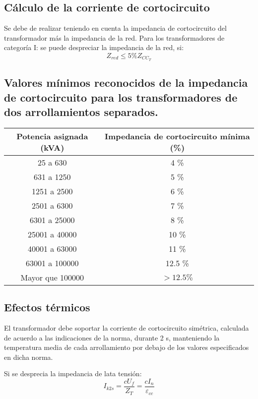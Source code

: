 \subsection{Cálculo de la corriente de cortocircuito}
Se debe de realizar teniendo en cuenta la impedancia de cortocircuito del transformador más la impedancia de la red. Para los transformadores de categoría I: se puede despreciar la impedancia de la red, si:
\begin{equation}
	Z_{red}\le 5\% Z_{CC_T}
\end{equation}
\subsection{Valores mínimos reconocidos de la impedancia de cortocircuito para los transformadores de dos arrollamientos separados.}
\begin{table}[H]
	\centering
	\begin{tabular}{|c|c|}
		\hline
		\textbf{Potencia asignada (kVA)} & \textbf{Impedancia de cortocircuito mínima (\%)} \\
		\hline
		25 a 630 & 4 \% \\
		631 a 1250 & 5 \% \\
		1251 a 2500 & 6 \% \\
		2501 a 6300 & 7 \% \\
		6301 a 25000 & 8 \% \\
		25001 a 40000 & 10 \% \\
		40001 a 63000 & 11 \% \\
		63001 a 100000 & 12.5 \% \\
		Mayor que 100000 & $> 12.5 \%$ \\
		\hline
	\end{tabular}
\end{table}
\subsection{Efectos térmicos}
El transformador debe soportar la corriente de cortocircuito simétrica, calculada
de acuerdo a las indicaciones de la norma, durante 2 s, manteniendo la temperatura
media de cada arrollamiento por debajo de los valores especificados en dicha norma.
\newline

Si se desprecia la impedancia de lata tensión:
\begin{equation}
	I_{k2s}=\dfrac{cU_f}{Z_T}=\dfrac{cI_n}{\varepsilon_{cc}}
\end{equation}

